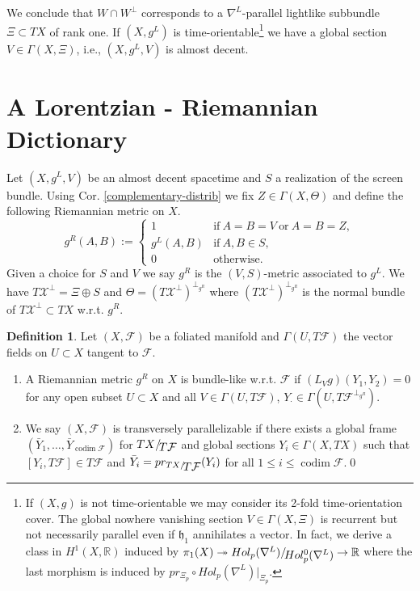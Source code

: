 \documentclass[a4paper,10pt,twoside]{amsart}
\theoremstyle{definition}
\newtheorem{definition}[theorem]{Definition}
\theoremstyle{remark}
\numberwithin{equation}{section}
\begin{document}
We conclude that $W \cap W^{\perp}$ corresponds to a $\nabla^{L}$-parallel lightlike subbundle $\Xi \subset TX$ of rank one. If $(X,g^{L})$ is
time-orientable\footnote{If $(X,g)$ is not time-orientable we may consider its 2-fold time-orientation cover. The global nowhere vanishing section
					$V \in \Gamma(X,\Xi)$ is recurrent but not necessarily parallel even if ${\mathfrak{{h}}}_{1}$ annihilates a vector.
					In fact, we derive a class in $H^{1}(X,{\mathbb{R}})$ induced by
					$\pi_{1}(X) \twoheadrightarrow {{{Hol_{p}(\nabla^{L})}}/\!\raisebox{-.575ex}{\ensuremath{{Hol^{0}_{p}(\nabla^{L})}}}} \rightarrow {\mathbb{R}}$ where the last
					morphism is induced by $pr_{\Xi_{p}} \circ Hol_{p}(\nabla^{L})|_{\Xi_{p}}$.}
we have a global section $V \in \Gamma(X,\Xi)$, i.e., $(X,g^{L},V)$ is almost decent.
\section{A Lorentzian - Riemannian Dictionary}
Let $(X,g^{L},V)$ be an almost decent spacetime and $S$ a realization of the screen bundle. Using Cor. \ref{complementary-distrib} we fix
$Z \in \Gamma(X,\Theta)$ and define the following Riemannian metric on $X$.
\begin{equation*}
	g^{R}(A,B) := \begin{cases}
				1 &\text{if}~A=B=V~\text{or}~A=B=Z,\\
				g^{L}(A,B) &\text{if}~A,B \in S,\\
				0 &\text{otherwise}.
			\end{cases}
\end{equation*}
Given a choice for $S$ and $V$ we say $g^{R}$ is the $(V,S)$-metric associated to $g^{L}$. We have $T\mathcal{X}^{\perp} = \Xi \oplus S$ and
$\Theta = (T\mathcal{X}^{\perp})^{\perp_{g^{R}}}$ where $(T\mathcal{X}^{\perp})^{\perp_{g^{R}}}$ is the normal bundle of $T\mathcal{X}^{\perp} \subset TX$
w.r.t. $g^{R}$.
\begin{definition}
	Let $(X,\mathcal{F})$ be a foliated manifold and $\Gamma(U,T\mathcal{F})$ the vector fields on $U \subset X$ tangent to $\mathcal{F}$.
	\begin{enumerate}
		\item
		A Riemannian metric $g^{R}$ on $X$ is bundle-like w.r.t. $\mathcal{F}$ if $(L_{V}g)(Y_{1},Y_{2})=0$ for any open
		subset $U \subset X$ and all $V \in \Gamma(U,T\mathcal{F})$, $Y_{\cdot} \in \Gamma(U,T\mathcal{F}^{\perp_{g^{R}}})$.
		\item
		We say $(X,\mathcal{F})$ is transversely parallelizable if there exists a global frame
		$(\bar{Y}_{1},\ldots,\bar{Y}_{\operatorname{co dim}\mathcal{F}})$ for ${{{TX}}/\!\raisebox{-.575ex}{\ensuremath{{T\mathcal{F}}}}}$ and
		global sections $Y_{i} \in \Gamma(X,TX)$ such that $[Y_{i},T\mathcal{F}] \in T\mathcal{F}$ and
		$\bar{Y}_{i}=pr_{{{{TX}}/\!\raisebox{-.575ex}{\ensuremath{{T\mathcal{F}}}}}}(Y_{i})$ for all $1 \leq i \leq \operatorname{co dim}\mathcal{F}$.\qed
	\end{enumerate}
\end{definition}
\end{document}
